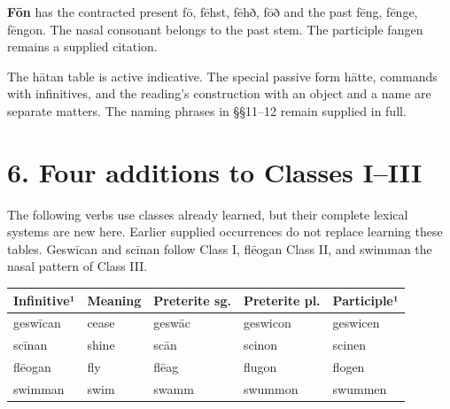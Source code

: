 \textbf{Fōn} has the contracted present fō, fēhst, fēhð, fōð and the past fēng, fēnge, fēngon. The nasal consonant belongs to the past stem. The participle fangen remains a supplied citation.

The hātan table is active indicative. The special passive form hātte, commands with infinitives, and the reading’s construction with an object and a name are separate matters. The naming phrases in §§11–12 remain supplied in full.

\section*{6. Four additions to Classes I–III}

The following verbs use classes already learned, but their complete lexical systems are new here. Earlier supplied occurrences do not replace learning these tables. Geswīcan and scīnan follow Class I, flēogan Class II, and swimman the nasal pattern of Class III.

\par\begingroup
\fontsize{10.5}{13.2}\selectfont
\setlength{\LTleft}{0pt}\setlength{\LTright}{\fill}
\noindent
\begin{tabular}{@{}>{\raggedright\arraybackslash}p{23.14mm}>{\raggedright\arraybackslash}p{21.04mm}>{\raggedright\arraybackslash}p{22.72mm}>{\raggedright\arraybackslash}p{22.72mm}>{\raggedright\arraybackslash}p{23.14mm}@{}}
\toprule
\textbf{Infinitive¹} & \textbf{Meaning} & \textbf{Preterite sg.} & \textbf{Preterite pl.} & \textbf{Participle¹} \\
\midrule
geswīcan & cease & geswāc & geswicon & geswicen \\
scīnan & shine & scān & scinon & scinen \\
flēogan & fly & flēag & flugon & flogen \\
swimman & swim & swamm & swummon & swummen \\
\bottomrule
\end{tabular}
\par\endgroup


